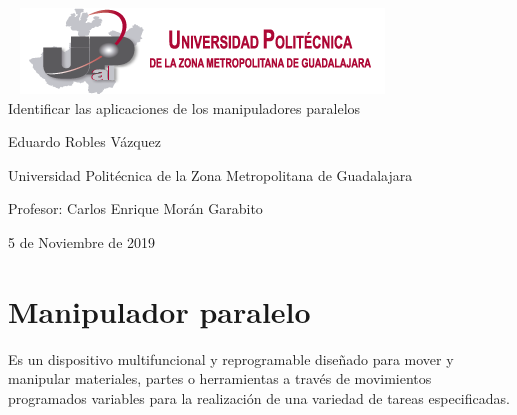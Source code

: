 \documentclass[11pt,a4paper,oldfontcommands,oneside]{memoir}
\begin{document}
%
%
\thispagestyle{empty}

{%
\sffamily
\centering
\Large

~\vspace{\fill}
\includegraphics[scale=1]{logo1.png} \\
{\huge 
\vspace{4cm}
Identificar las aplicaciones de los manipuladores paralelos
}
\vspace{2.5cm}

{\LARGE
Eduardo Robles Vázquez
}

\vspace{2.5cm}

Universidad Politécnica de la Zona Metropolitana de Guadalajara

\vspace{3.5cm}

Profesor: Carlos Enrique Morán Garabito

\vspace{\fill}

5 de Noviembre de 2019

}%

\vspace{.5cm}
\hfill\break




\tableofcontents*

\clearpage


\chapter{Manipulador paralelo} 

Es un dispositivo multifuncional y reprogramable diseñado para mover y manipular materiales, partes o herramientas a través de movimientos programados variables para la realización de una variedad de tareas especificadas.\\
\end{document}
